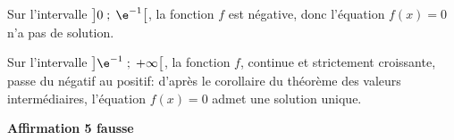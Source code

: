 \begin{enumerate}
Sur l'intervalle $\left ]0\;;\;\e^{-1}\strut\right [$, la fonction $f$ est négative, donc l'équation $f(x)=0$ n'a pas de solution.

Sur l'intervalle $\left ]\e^{-1}\;;\; +\infty\strut\right [$, la fonction $f$, continue et strictement croissante, passe du négatif au positif: d'après le corollaire du théorème des valeurs intermédiaires, l'équation $f(x)=0$ admet une solution unique.

\hfill\textbf{Affirmation 5 fausse}
\end{enumerate}
